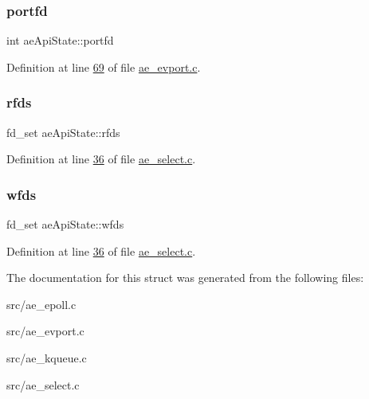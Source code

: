 \subsubsection{\texorpdfstring{portfd}{portfd}}
{\footnotesize\ttfamily int ae\+Api\+State\+::portfd}



Definition at line \hyperlink{ae__evport_8c_source_l00069}{69} of file \hyperlink{ae__evport_8c_source}{ae\+\_\+evport.\+c}.

\mbox{\label{structaeApiState_a3faa88b3bb101d3f8879a4c167a553d8}} 
\subsubsection{\texorpdfstring{rfds}{rfds}}
{\footnotesize\ttfamily fd\+\_\+set ae\+Api\+State\+::rfds}



Definition at line \hyperlink{ae__select_8c_source_l00036}{36} of file \hyperlink{ae__select_8c_source}{ae\+\_\+select.\+c}.

\mbox{\label{structaeApiState_a5e0a54365408102a313690971e9e6d95}} 
\subsubsection{\texorpdfstring{wfds}{wfds}}
{\footnotesize\ttfamily fd\+\_\+set ae\+Api\+State\+::wfds}



Definition at line \hyperlink{ae__select_8c_source_l00036}{36} of file \hyperlink{ae__select_8c_source}{ae\+\_\+select.\+c}.



The documentation for this struct was generated from the following files\+:\begin{DoxyCompactItemize}
\item 
src/ae\+\_\+epoll.\+c\item 
src/ae\+\_\+evport.\+c\item 
src/ae\+\_\+kqueue.\+c\item 
src/ae\+\_\+select.\+c\end{DoxyCompactItemize}
